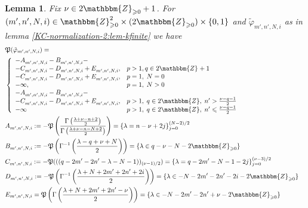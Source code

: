 \documentclass{article}
\newcommand{\assign}{:=}
\numberwithin{definition}{section}
\newtheorem{lemma}{Lemma}
\numberwithin{lemma}{section}
\numberwithin{proposition}{section}
{\theorembodyfont{\rmfamily}\newtheorem{remark}{Remark}
\numberwithin{remark}{section}
}
\begin{document}
\begin{lemma}
  \label{KC-normalization-2:lem-Pcomputation}Fix $\nu \in
  2\mathbbm{Z}_{\geqslant 0} + 1$. For $( m', n', N, i) \in
  \mathbbm{Z}_{\geqslant 0}^2 \times ( 2\mathbbm{Z}_{\geqslant 0}) \times \{
  0, 1 \}$ and $\tilde{\varphi}_{m', n', N, i}$ as in lemma
  \ref{KC-normalization-2:lem-kfinite} we have
  \begin{eqnarray}
    & \mathfrak{P} ( \tilde{\varphi}_{m', n', N, i}) = &  \nonumber\\
    & \left\{ \begin{array}{ll}
      - A^{}_{m', n', N, i} - B^{}_{m', n', N, i} - & \\
      - C^{}_{m', n', N, i} - D^{}_{m', n', N, i} + E^{}_{m', n', N, i}, & p >
      1, q \in 2\mathbbm{Z}_{} + 1\\
      - C^{}_{m', n', N, i} - D^{}_{m', n', N, i} + E^{}_{m', n', N, i}, & p =
      1, \; N = 0\\
      - \infty, & p = 1, \; N > 0\\
      - A^{}_{m', n', N, i} - B^{}_{m', n', N, i} - & \\
      - C^{}_{m', n', N, i} - D^{}_{m', n', N, i} + E^{}_{m', n', N, i}, & p >
      1, \; q \in 2\mathbbm{Z}, \; n' > \frac{\nu - q - 1}{2}\\
      - \infty & p > 1, \; q \in 2\mathbbm{Z}, \; n' \leqslant \frac{\nu - q -
      1}{2}
    \end{array} \right. &  \nonumber\\
    & A^{}_{m', n', N, i} \assign -\mathfrak{P} \left( \frac{\Gamma \left(
    \frac{\lambda + \nu - n + 2}{2} \right)}{\Gamma \left( \frac{\lambda + \nu
    - n - N + 2}{2} \right)} \right) = \{ \lambda = n - \nu + 2 j \}_{j =
    0}^{( N - 2) / 2} &  \nonumber\\
    & B^{}_{m', n', N, i} \assign -\mathfrak{P} \left( \Gamma^{- 1} \left(
    \frac{\lambda - q + \nu + N}{2} \right) \right) = \{ \lambda \in q - \nu -
    N - 2\mathbbm{Z}_{\geqslant 0} \} &  \nonumber\\
    & C^{}_{m', n', N, i} \assign -\mathfrak{P} ( ( ( q - 2 m' - 2 n' -
    \lambda - N - 1))_{( \nu - 1) / 2}) = \{ \lambda = q - 2 m' - N - 1 - 2 j
    \}_{j = 0}^{( \nu - 3) / 2} &  \nonumber\\
    & D^{}_{m', n', N, i} \assign -\mathfrak{P} \left( \Gamma^{- 1} \left(
    \frac{\lambda + N + 2 m' + 2 n' + 2 i}{2} \right) \right) = \{ \lambda \in
    - N - 2 m' - 2 n' - 2 i - 2\mathbbm{Z}_{\geqslant 0} \} &  \nonumber\\
    & E_{m', n', N, i} =\mathfrak{P} \left( \Gamma \left( \frac{\lambda + N +
    2 m' + 2 n' - \nu}{2} \right) \right) = \{ \lambda \in - N - 2 m' - 2 n' +
    \nu - 2\mathbbm{Z}_{\geqslant 0} \} &  \nonumber
  \end{eqnarray}
\end{lemma}
\end{document}
